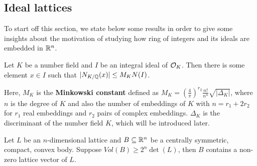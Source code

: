 \documentclass[../main.tex]{subfiles}
\begin{document}
\subsection{Ideal lattices}

\iffalse
Recall that a canonical embedding $\sigma$ of an algebraic number field $K$ of degree $n$ to the canonical space $H$ is
\begin{align*}
    \sigma: K &\rightarrow H \cong \R^{s_1} \times \C^{2s_2} \subseteq \C^n \\
    \sigma(r) &\mapsto \left(\sigma_1(r), \dots, \sigma_{s_1}(r), \sigma_{s_1+1}(r),\dots, \sigma_n(r)\right),
\end{align*}
where $\sigma_{s_1 + j}(r) = \overline{\sigma_{s_1 + s_2 + j}(r)}$ are conjugate pairs for all $j \in [s_2]$ that correspond to the complex embeddings into $H$.

\fi 




To start off this section, we state below some results in order to give some insights about the motivation of studying how ring of integers and its ideals are embedded in $\mathbb{R}^n$.

\begin{proposition}
\label{app prop:small norm}
\reversemarginpar
{}
Let $K$ be a number field and $I$ be an integral ideal of $\mathcal{O}_K$. Then there is some element $x \in I$ such that $|N_{K/\mathbb{Q}}(x)| \le M_K N(I)$.
\end{proposition}
Here, $M_K$ is the \textbf{Minkowski constant} defined as $M_K=\left(\frac{4}{\pi}\right)^{r_2} \frac{n!}{n^n}\sqrt{|\Delta_K|}$, where $n$ is the degree of $K$ and also the number of embeddings of $K$ with $n=r_1+2r_2$ for $r_1$ real embeddings and $r_2$ pairs of complex embeddings. $\Delta_K$ is the discriminant of the number field $K$, which will be introduced later.  

\begin{theorem}
\label{app thm:min 1st}
\reversemarginpar
{}
Let $L$ be an $n$-dimensional lattice and $B\subseteq \mathbb{R}^n$ be a centrally symmetric, compact, convex body. Suppose $Vol(B) \ge 2^n \det(L)$, then $B$ contains a non-zero lattice vector of $L$.
\end{theorem}
\end{document}
